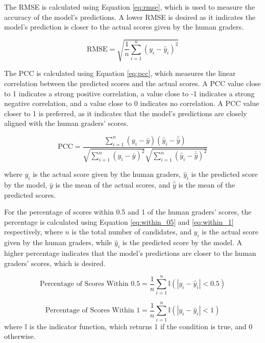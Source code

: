 The RMSE is calculated using Equation \ref{eq:rmse}, which is used to measure the accuracy of the model's predictions. A lower RMSE is desired as it indicates the model's prediction is closer to the actual scores given by the human graders.

\begin{equation} \label{eq:rmse}
  \text{RMSE} = \sqrt{\frac{1}{n} \sum_{i=1}^{n} (y_i - \hat{y}_i)^2}
\end{equation}

The PCC is calculated using Equation \ref{eq:pcc}, which measures the linear correlation between the predicted scores and the actual scores. A PCC value close to 1 indicates a strong positive correlation, a value close to -1 indicates a strong negative correlation, and a value close to 0 indicates no correlation. A PCC value closer to 1 is preferred, as it indicates that the model's predictions are closely aligned with the human graders' scores.

\begin{equation} \label{eq:pcc}
  \text{PCC} = \frac{\sum_{i=1}^{n} (y_i - \bar{y})(\hat{y}_i - \bar{\hat{y}})}{\sqrt{\sum_{i=1}^{n} (y_i - \bar{y})^2} \sqrt{\sum_{i=1}^{n} (\hat{y}_i - \bar{\hat{y}})^2}}
\end{equation}

where $y_i$ is the actual score given by the human graders, $\hat{y}_i$ is the predicted score by the model, $\bar{y}$ is the mean of the actual scores, and $\bar{\hat{y}}$ is the mean of the predicted scores.

For the percentage of scores within 0.5 and 1 of the human graders' scores, the percentage is calculated using Equation \ref{eq:within_05} and \ref{eq:within_1} respectively, where $n$ is the total number of candidates, and $y_i$ is the actual score given by the human graders, while $\hat{y}_i$ is the predicted score by the model. A higher percentage indicates that the model's predictions are closer to the human graders' scores, which is desired.

\begin{equation} \label{eq:within_05}
  \text{Percentage of Scores Within 0.5} = \frac{1}{n} \sum_{i=1}^{n} \mathbb{I}(|y_i - \hat{y}_i| < 0.5)
\end{equation}

\begin{equation} \label{eq:within_1}
  \text{Percentage of Scores Within 1} = \frac{1}{n} \sum_{i=1}^{n} \mathbb{I}(|y_i - \hat{y}_i| < 1)
\end{equation}
where $\mathbb{I}$ is the indicator function, which returns 1 if the condition is true, and 0 otherwise.

